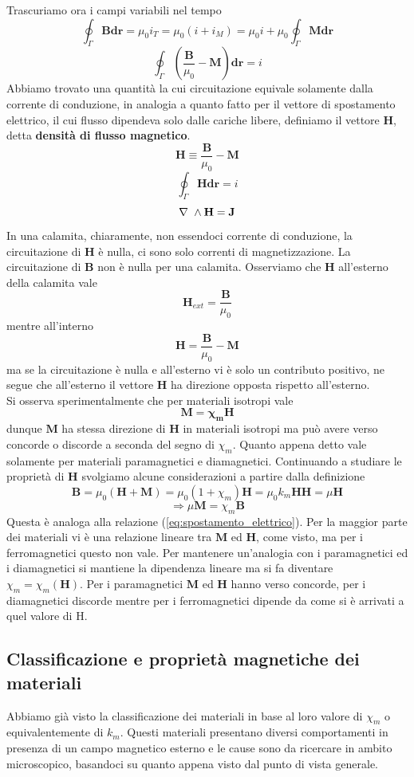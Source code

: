 \documentclass[
10pt, %
a4paper, %
oneside, %
headinclude,footinclude, %
BCOR5mm, %
]{scrartcl}
\begin{document}
Trascuriamo ora i campi variabili nel tempo
\[\oint_\Gamma \mathbf{B}\mathbf{dr} = \mu_0 i_T = \mu_0(i + i_M)=\mu_0 i +\mu_0\oint_\Gamma \mathbf{M}\mathbf{dr}\]
\[\oint_\Gamma\left(\frac{\mathbf{B}}{\mu_0}-\mathbf{M}\right)\mathbf{dr} = i\]
Abbiamo trovato una quantità la cui circuitazione equivale solamente dalla corrente di conduzione, in analogia a quanto fatto per il vettore di spostamento elettrico, il cui flusso dipendeva solo dalle cariche libere, definiamo il vettore \(\mathbf{H}\), detta \textbf{densità di flusso magnetico}. 
\[\mathbf{H}\equiv \frac{\mathbf{B}}{\mu_0}- \mathbf{M}\]
\[\oint_\Gamma\mathbf{H}\mathbf{dr} = i\]
\[\nabla\ \wedge\mathbf{H}=\mathbf{J}\]
In una calamita, chiaramente, non essendoci corrente di conduzione, la circuitazione di \(\mathbf{H}\) è nulla, ci sono solo correnti di magnetizzazione. La circuitazione di \(\mathbf{B}\) non è nulla per una calamita. Osserviamo che \(\mathbf{H}\) all'esterno della calamita vale
\[\mathbf{H}_{ext} = \frac{\mathbf{B}}{\mu_0}\]
mentre all'interno 
\[\mathbf{ H }= \frac{\mathbf{B}}{\mu_0}- \mathbf{M}\] 
ma se la circuitazione è nulla e all'esterno vi è solo un contributo positivo, ne segue che all'esterno il vettore \(\mathbf{H}\) ha direzione opposta rispetto all'esterno.\\
Si osserva sperimentalmente che per materiali isotropi vale
\[\mathbf{M = \chi_m\mathbf{H}}\]
dunque \(\mathbf{M}\) ha stessa direzione di \(\mathbf{H}\) in materiali isotropi ma può avere verso concorde o discorde a seconda del segno di \(\chi_m\). Quanto appena detto vale solamente per materiali paramagnetici e diamagnetici. Continuando a studiare le proprietà di \(\mathbf{H}\) svolgiamo alcune considerazioni a partire dalla definizione
\[\mathbf{B} = \mu_0 (\mathbf{H}+\mathbf{M}) = \mu_0 (1 +\chi_m)\mathbf{H} = \mu_0 k_m\mathbf{HH}=\mu \mathbf{H}\]
\[\Rightarrow \mu\mathbf{M} = \chi_m \mathbf{B}\]
Questa è analoga alla relazione (\ref{eq:spostamento_elettrico}). Per la maggior parte dei materiali vi è una relazione lineare tra \(\mathbf{M}\) ed \(\mathbf{H}\), come visto, ma per i ferromagnetici questo non vale. Per mantenere un'analogia con i paramagnetici ed i diamagnetici si mantiene la dipendenza lineare ma si fa diventare \(\chi_m = \chi_m(\mathbf{H})\). Per i paramagnetici \(\mathbf{M}\) ed \(\mathbf{H}\) hanno verso concorde, per i diamagnetici discorde mentre per i ferromagnetici dipende da come si è arrivati a quel valore di H.
\subsection{Classificazione e proprietà magnetiche dei materiali}
Abbiamo già visto la classificazione dei materiali in base al loro valore di $\chi_m$ o equivalentemente di \(k_m\). Questi materiali presentano diversi comportamenti in presenza di un campo magnetico esterno e le cause sono da ricercare in ambito microscopico, basandoci su quanto appena visto dal punto di vista generale. 
\end{document}
